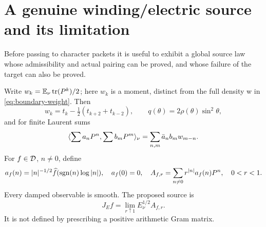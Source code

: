 \section{A genuine winding/electric source and its limitation}\label{sec:winding}
Before passing to character packets it is useful to exhibit a global
source law whose admissibility and actual pairing can be proved,
and whose failure of the target can also be proved.

Write $w_k=\mathbb E_\nu\operatorname{tr}(P^k)/2$; here $w_k$ is a moment, distinct
from the full density w in \eqref{eq:boundary-weight}. Then
\begin{equation}
w_k=t_k-\tfrac12(t_{k+2}+t_{k-2}),\qquad
q(\theta)=2\rho(\theta)\sin^2\theta,
\end{equation}
and for finite Laurent sums
\begin{equation}\label{eq:laurent-pair}
\langle \sum a_nP^n,\sum b_mP^m\rangle_\nu
=\sum_{n,m}\bar a_n b_m w_{m-n}.
\end{equation}
For $f\in\mathcal D$, $n\ne0$, define
\begin{equation}
a_f(n)=|n|^{-1/2}\widehat f(\operatorname{sgn}(n)\log|n|),\quad a_f(0)=0,
\quad A_{f,r}=\sum_{n\ne0}r^{|n|}a_f(n)P^n,\quad0<r<1.
\end{equation}
Every damped observable is smooth. The proposed source is
\begin{equation}\label{eq:winding-source}
J_Ef=\lim_{r\uparrow1}E_\nu^{1/2}A_{f,r}.
\end{equation}
It is not defined by prescribing a positive arithmetic Gram matrix.

